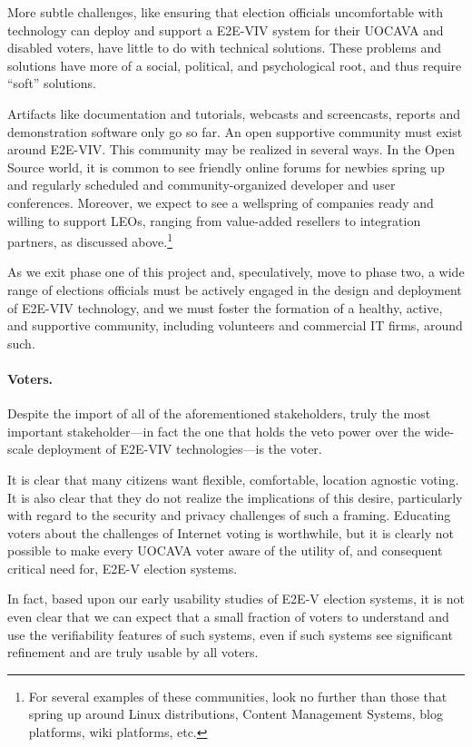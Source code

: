 More subtle challenges, like ensuring that election officials
uncomfortable with technology can deploy and support a E2E-VIV system
for their UOCAVA and disabled voters, have little to do with technical
solutions. These problems and solutions have more of a social,
political, and psychological root, and thus require ``soft''
solutions.

Artifacts like documentation and tutorials, webcasts and screencasts,
reports and demonstration software only go so far. An open supportive
community must exist around E2E-VIV.  This community may be realized
in several ways.  In the Open Source world, it is common to see
friendly online forums for newbies spring up and regularly scheduled
and community-organized developer and user conferences.  Moreover, we
expect to see a wellspring of companies ready and willing to support
LEOs, ranging from value-added resellers to integration partners, as
discussed above.\footnote{For several examples of these communities,
  look no further than those that spring up around Linux
  distributions, Content Management Systems, blog platforms, wiki
  platforms, etc.}
  
As we exit phase one of this project and, speculatively, move to phase
two, a wide range of elections officials must be actively engaged in
the design and deployment of E2E-VIV technology, and we must foster
the formation of a healthy, active, and supportive community,
including volunteers and commercial IT firms, around such.

\paragraph{Voters.} Despite the import of all of the aforementioned
stakeholders, truly the most important stakeholder---in fact the one
that holds the veto power over the wide-scale deployment of E2E-VIV
technologies---is the voter.

It is clear that many citizens want flexible, comfortable, location
agnostic voting.  It is also clear that they do not realize the
implications of this desire, particularly with regard to the security
and privacy challenges of such a framing.  Educating voters about the
challenges of Internet voting is worthwhile, but it is clearly not
possible to make every UOCAVA voter aware of the utility of, and
consequent critical need for, E2E-V election systems.

In fact, based upon our early usability studies of E2E-V election
systems, it is not even clear that we can expect that a small fraction
of voters to understand and use the verifiability features of such
systems, even if such systems see significant refinement and are
truly usable by all voters.


